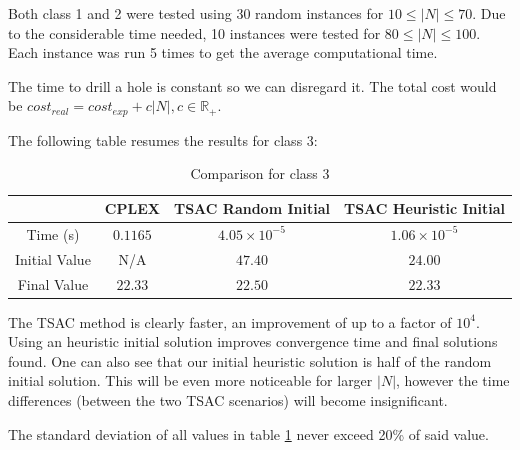 \documentclass[a4paper,12pt]{article}
\begin{document}
		Both class 1 and 2 were tested using 30 random instances for $ 10 \le |N| \le 70 $.
		Due to the considerable time needed, 10 instances were tested for $ 80 \le |N| \le 100 $.
		Each instance was run 5 times to get the average computational time.
		
		The time to drill a hole is constant so we can disregard it.
		The total cost would be $ cost_{real}  = cost_{exp} + c|N|, c\in \mathbb{R}_+$.
		
		
		The following table resumes the results for class 3:
		\begin{table}[H]
			\centering
			\begin{tabular}{c|c|c|c}
				\textbf{}			& \textbf{CPLEX} 	& \textbf{TSAC Random Initial}  & \textbf{TSAC Heuristic Initial}  \\ \hline
				Time (s)			& $ 0.1165 $ 		& $ 4.05 \times 10^{-5} $ 		& $ 1.06 \times 10^{-5} $ \\ \hline
				Initial Value		& N/A		 		& $ 47.40 $ 					& $ 24.00 $ 					\\ \hline 
				Final Value			& $ 22.33 $	 		& $ 22.50 $ 					& $ 22.33 $ 				\\  
			\end{tabular}
			\caption{Comparison for class 3}
			\label{table:times3}
		\end{table}
	
		The TSAC method is clearly faster, an improvement of up to a factor of $ 10^4 $.
		Using an heuristic initial solution improves convergence time and final solutions found.
		One can also see that our initial heuristic solution is half of the random initial solution.
		This will be even more noticeable for larger $ |N| $, however the time differences (between the two TSAC scenarios) will become insignificant.
		
		The standard deviation of all values in table \ref{table:times3} never exceed 20\% of said value.
		
\end{document}
